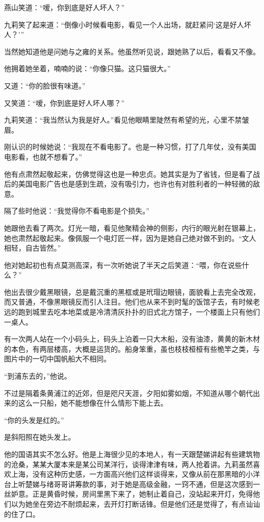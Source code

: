 \par 燕山笑道：“嗳，你到底是好人坏人？”
\par 九莉笑了起来道：“倒像小时候看电影，看见一个人出场，就赶紧问‘这是好人坏人？'”
\par 当然她知道他是问她与之雍的关系。他虽然听见说，跟她熟了以后，看看又不像。
\par 他拥着她坐着，喃喃的说：“你像只猫。这只猫很大。”
\par 又道：“你的脸很有味道。”
\par 又笑道：“嗳，你到底是好人坏人哪？”
\par 九莉笑道：“我当然认为我是好人。”看见他眼睛里陡然有希望的光，心里不禁皱眉。
\par 刚认识的时候她说：“我现在不看电影了。也是一种习惯，打了几年仗，没有美国电影看，也就不想看了。”
\par 他有点肃然起敬起来，仿佛觉得这也是一种忠贞。她其实是为了省钱，但是看了战后的美国电影广告也是感到生疏，没有吸引力，也许也有对胜利者的一种轻微的敌意。
\par 隔了些时他说：“我觉得你不看电影是个损失。”
\par 她跟他去看了两次。灯光一暗，看见他聚精会神的侧影，内行的眼光射在银幕上，她也肃然起敬起来。像佩服一个电灯匠一样，因为是她自己绝对做不到的。“文人相轻，自古皆然。”
\par 他对她起初也有点莫测高深，有一次听她说了半天之后笑道：“喂，你在说些什么？”
\par 他出去很少戴黑眼镜，总是戴沉重的黑框或是玳瑁边眼镜，面貌看上去完全改观，而又普通，不像黑眼镜反而引人注目。他们也从来不到时髦的饭馆子去，有时候老远的跑到城里去吃本地菜或是冷清清灰扑扑的旧式北方馆子，一个楼面上只有他们一桌人。
\par 有一次两人站在一个小码头上，码头上泊着一只大木船，没有油漆，黄黄的新木材的本色，有两层楼高，大概是运货的。船身笨重，虽也枝枝桠桠有些桅竿之类，与图片中的一切中国帆船大不相同。
\par “到浦东去的，”他说。
\par 不过是隔着条黄浦江的近郊，但是咫尺天涯，夕阳如雾如烟，不知道从哪个朝代出来的这么一只船，她不能想像在什么情形下能上去。
\par “你的头发是红的。”
\par 是斜阳照在她头发上。
\par 他的国语其实不怎么好。他是上海很少见的本地人，有一天跟楚娣讲起有些建筑物的沧桑，某某大厦本来是某公司某洋行，谈得津津有味，两人抢着讲。九莉虽然喜欢上海，没有这种历史感，一方面高兴他们这样谈得来，又像从前在那黑暗的小洋台上听楚娣与绪哥哥讲筹款的事，对于她是高级金融，一窍不通，但是这次感到一丝妒意。正是黄昏时候，房间里黑下来了，她制止着自己，没站起来开灯，免得他们以为她坐在旁边不耐烦起来，去开灯打断话锋。但是他们还是觉得了，有点讪讪的住了口。
